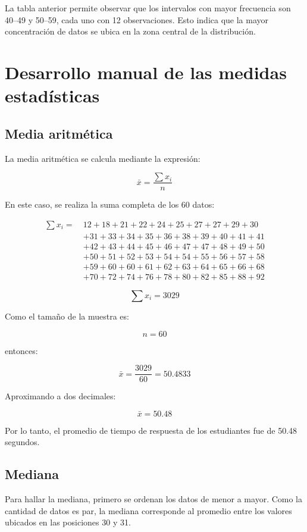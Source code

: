 \documentclass[12pt,letterpaper]{article}
\begin{document}
La tabla anterior permite observar que los intervalos con mayor frecuencia son 40--49 y 50--59, cada uno con 12 observaciones. Esto indica que la mayor concentración de datos se ubica en la zona central de la distribución.

\section{Desarrollo manual de las medidas estadísticas}

\subsection{Media aritmética}

La media aritmética se calcula mediante la expresión:

\[
\bar{x}=\frac{\sum x_i}{n}
\]

En este caso, se realiza la suma completa de los 60 datos:

\begin{align*}
\sum x_i =\ &12+18+21+22+24+25+27+27+29+30 \\
&+31+33+34+35+36+38+39+40+41+41 \\
&+42+43+44+45+46+47+47+48+49+50 \\
&+50+51+52+53+54+54+55+56+57+58 \\
&+59+60+60+61+62+63+64+65+66+68 \\
&+70+72+74+76+78+80+82+85+88+92
\end{align*}

\[
\sum x_i = 3029
\]

Como el tamaño de la muestra es:

\[
n=60
\]

entonces:

\[
\bar{x}=\frac{3029}{60}=50.4833
\]

Aproximando a dos decimales:

\[
\bar{x}=50.48
\]

Por lo tanto, el promedio de tiempo de respuesta de los estudiantes fue de 50.48 segundos.

\subsection{Mediana}

Para hallar la mediana, primero se ordenan los datos de menor a mayor. Como la cantidad de datos es par, la mediana corresponde al promedio entre los valores ubicados en las posiciones 30 y 31.
\end{document}
